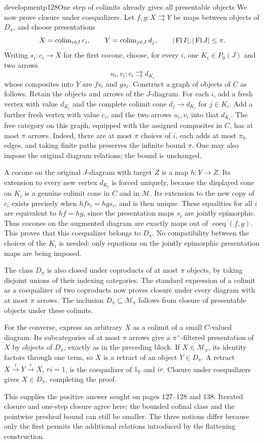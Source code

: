 \begin{dcomment}{development}{p128}{One step of colimits already gives all presentable objects}
We now prove closure under coequalizers. Let $f,g:X\rightrightarrows Y$ be maps between objects of $D_\pi$, and choose presentations
\[
 X=\operatorname{colim}_{i\in I}c_i,
 \qquad Y=\operatorname{colim}_{j\in J}d_j,
 \qquad |\operatorname{Fl} I|,|\operatorname{Fl} J|\leq\pi.
\]
Writing $s_i:c_i\to X$ for the first cocone, choose, for every $i$, one $K_i\in P_0(J)$ and two arrows
\[
 u_i,v_i:c_i\rightrightarrows d_{K_i}
\]
whose composites into $Y$ are $fs_i$ and $gs_i$. Construct a graph of objects of $C$ as follows. Retain the objects and arrows of the $J$-diagram. For each $i$, add a fresh vertex with value $d_{K_i}$ and the complete colimit cone $d_j\to d_{K_i}$ for $j\in K_i$. Add a further fresh vertex with value $c_i$, and the two arrows $u_i,v_i$ into that $d_{K_i}$. The free category on this graph, equipped with the assigned composites in $C$, has at most $\pi$ arrows. Indeed, there are at most $\pi$ choices of $i$, each adds at most $\pi_0$ edges, and taking finite paths preserves the infinite bound $\pi$. One may also impose the original diagram relations; the bound is unchanged.

A cocone on the original $J$-diagram with target $Z$ is a map $h:Y\to Z$. Its extension to every new vertex $d_{K_i}$ is forced uniquely, because the displayed cone on $K_i$ is a genuine colimit cone in $C$ and in $\mathcal M$. Its extension to the new copy of $c_i$ exists precisely when $hfs_i=hgs_i$, and is then unique. These equalities for all $i$ are equivalent to $hf=hg$, since the presentation maps $s_i$ are jointly epimorphic. Thus cocones on the augmented diagram are exactly maps out of $\operatorname{coeq}(f,g)$. This proves that this coequalizer belongs to $D_\pi$. No compatibility between the choices of the $K_i$ is needed: only equations on the jointly epimorphic presentation maps are being imposed.

The class $D_\pi$ is also closed under coproducts of at most $\pi$ objects, by taking disjoint unions of their indexing categories. The standard expression of a colimit as a coequalizer of two coproducts now proves closure under every diagram with at most $\pi$ arrows. The inclusion $D_\pi\subseteq\mathcal M_\pi$ follows from closure of presentable objects under these colimits.

For the converse, express an arbitrary $X$ as a colimit of a small $C$-valued diagram. Its subcategories of at most $\pi$ arrows give a $\pi^+$-filtered presentation of $X$ by objects of $D_\pi$, exactly as in the preceding block. If $X\in\mathcal M_\pi$, its identity factors through one term, so $X$ is a retract of an object $Y\in D_\pi$. A retract $X\xrightarrow{i}Y\xrightarrow{r}X$, $ri=1$, is the coequalizer of $1_Y$ and $ir$. Closure under coequalizers gives $X\in D_\pi$, completing the proof.

This supplies the positive answer sought on pages 127--128 and 138. Iterated closure and one-step closure agree here; the bounded cofinal class and the pointwise presheaf bound can still be smaller. The three notions differ because only the first permits the additional relations introduced by the flattening construction.
\end{dcomment}


